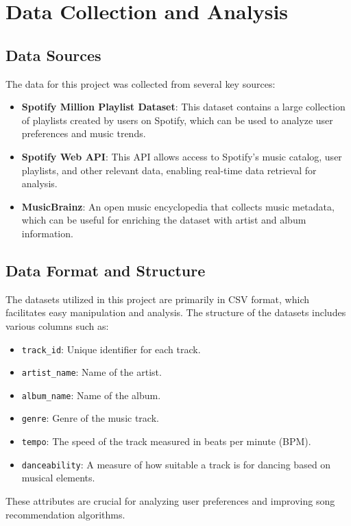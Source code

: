 \documentclass[runningheads]{llncs}
\begin{document}
\section{Data Collection and Analysis}

\subsection{Data Sources}
The data for this project was collected from several key sources:

\begin{itemize}
    \item \textbf{Spotify Million Playlist Dataset}: This dataset contains a large collection of playlists created by users on Spotify, which can be used to analyze user preferences and music trends.
    \item \textbf{Spotify Web API}: This API allows access to Spotify's music catalog, user playlists, and other relevant data, enabling real-time data retrieval for analysis.
    \item \textbf{MusicBrainz}: An open music encyclopedia that collects music metadata, which can be useful for enriching the dataset with artist and album information.
\end{itemize}

\subsection{Data Format and Structure}
The datasets utilized in this project are primarily in CSV format, which facilitates easy manipulation and analysis. The structure of the datasets includes various columns such as:

\begin{itemize}
    \item \texttt{track\_id}: Unique identifier for each track.
    \item \texttt{artist\_name}: Name of the artist.
    \item \texttt{album\_name}: Name of the album.
    \item \texttt{genre}: Genre of the music track.
    \item \texttt{tempo}: The speed of the track measured in beats per minute (BPM).
    \item \texttt{danceability}: A measure of how suitable a track is for dancing based on musical elements.
\end{itemize}

These attributes are crucial for analyzing user preferences and improving song recommendation algorithms.
\end{document}
